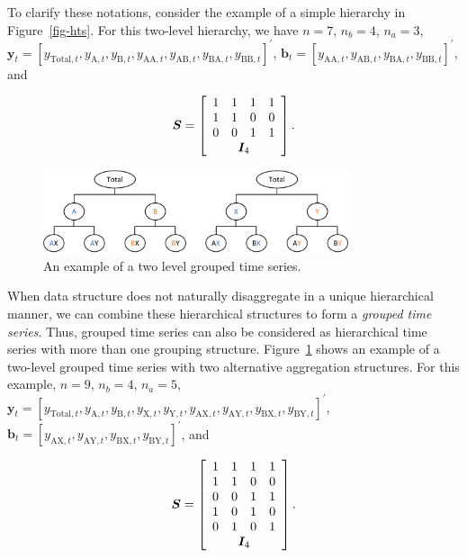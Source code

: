 \documentclass[11pt,a4paper,]{article}
\begin{document}
To clarify these notations, consider the example of a simple hierarchy
in Figure~\ref{fig-hts}. For this two-level hierarchy, we have
\(n = 7\), \(n_b = 4\), \(n_a = 3\),
\(\boldsymbol{y}_t = [y_{\text{Total},t}, y_{\text{A},t}, y_{\text{B},t}, y_{\text{AA},t}, y_{\text{AB},t}, y_{\text{BA},t}, y_{\text{BB},t}]^{\prime}\),
\(\boldsymbol{b}_t = [y_{\text{AA},t}, y_{\text{AB},t}, y_{\text{BA},t}, y_{\text{BB},t}]^{\prime}\),
and

\[
\boldsymbol{S} = \left[
\begin{array}{cccc}
1 & 1 & 1 & 1 \\
1 & 1 & 0 & 0 \\
0 & 0 & 1 & 1 \\
\multicolumn{4}{c}{\boldsymbol{I}_4}
\end{array}\right].
\]

\begin{figure}

{\centering \includegraphics[width=0.8\textwidth,height=\textheight]{figs/gts_example.pdf}

}

\caption{\label{fig-gts}An example of a two level grouped time series.}

\end{figure}

When data structure does not naturally disaggregate in a unique
hierarchical manner, we can combine these hierarchical structures to
form a \emph{grouped time series}. Thus, grouped time series can also be
considered as hierarchical time series with more than one grouping
structure. Figure~\ref{fig-gts} shows an example of a two-level grouped
time series with two alternative aggregation structures. For this
example, \(n = 9\), \(n_b = 4\), \(n_a = 5\),
\(\boldsymbol{y}_t = [y_{\text{Total},t}, y_{\text{A},t}, y_{\text{B},t}, y_{\text{X},t}, y_{\text{Y},t}, y_{\text{AX},t}, y_{\text{AY},t}, y_{\text{BX},t}, y_{\text{BY},t}]^{\prime}\),
\(\boldsymbol{b}_t = [y_{\text{AX},t}, y_{\text{AY},t}, y_{\text{BX},t}, y_{\text{BY},t}]^{\prime}\),
and

\[
\boldsymbol{S} = \left[
\begin{array}{cccc}
1 & 1 & 1 & 1 \\
1 & 1 & 0 & 0 \\
0 & 0 & 1 & 1 \\
1 & 0 & 1 & 0 \\
0 & 1 & 0 & 1 \\
\multicolumn{4}{c}{\boldsymbol{I}_4}
\end{array}\right].
\]
\end{document}
